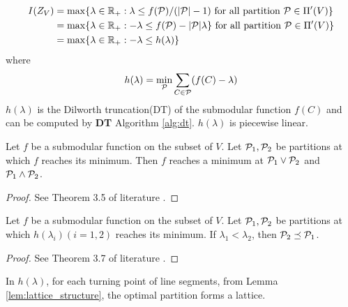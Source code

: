 \documentclass{article}
\begin{document}
\begin{align}
I(Z_V) &= \max\{ \lambda \in \R_+: \lambda \leq f(\P)/(\abs{\P} - 1) \text{ for all partition } \P \in \Pi'(V)\} \\
& = \max\{ \lambda \in \R_+:  -\lambda \leq f(\P) - \abs{\P} \lambda \} \text{ for all partition } \P \in \Pi'(V)\} \\
\label{eq:Connection}& = \max\{ \lambda \in \R_+: -\lambda \leq h(\lambda)\}
\end{align}
where 
\begin{equation}\label{eq:hLambda}
h(\lambda) = \min_{\P} \sum_{C\in \P} (f(C)-\lambda)
\end{equation}
$h(\lambda)$ is the Dilworth truncation(DT) of the submodular function $f(C)$ and can be computed by \textbf{DT} Algorithm \ref{alg:dt}. $h(\lambda)$
is piecewise linear. 

\begin{lemma}\label{lem:lattice_structure}
Let $f$ be a submodular function on the subset of $V$. Let $\P_1, \P_2$ be partitions
at which $f$ reaches its minimum. Then $f$ reaches a minimum at $\P_1 \vee \P_2$ and $\P_1 \wedge \P_2$.
\end{lemma}
\begin{proof}
See Theorem 3.5 of literature \cite{psp}.	
\end{proof}
\begin{lemma}\label{lem:hierarchical}
Let $f$ be a submodular function on the subset of $V$. Let $\P_1, \P_2$ be partitions
at which $h(\lambda_i)(i=1,2)$ reaches its minimum. 
If $\lambda_1 < \lambda_2$, then $\P_2 \preceq \P_1$.
\end{lemma}
\begin{proof}
	See Theorem 3.7 of literature \cite{psp}.	
\end{proof}


In $h(\lambda)$, for each turning point of line segments, 
from Lemma \ref{lem:lattice_structure},
the optimal partition forms a lattice. 
\end{document}
